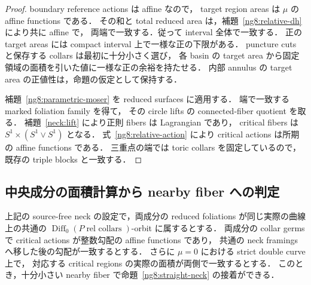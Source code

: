 \begin{proof}
boundary reference actions は affine なので，
target region areas は $\mu$ の affine functions である．
その和と total reduced area は，補題~\ref{ng8:relative-dh} により共に affine で，
両端で一致する．従って interval 全体で一致する．
正の target areas には compact interval 上で一様な正の下限がある．
puncture cuts と保存する collars は最初に十分小さく選び，
各 basin の target area から固定領域の面積を引いた値に一様な正の余裕を持たせる．
内部 annulus の target area の正値性は，命題の仮定として保持する．

補題~\ref{ng8:parametric-moser} を reduced surfaces に適用する．
端で一致する marked foliation family を得て，
その circle lifts の connected-fiber quotient を取る．
補題~\ref{neck:lift} により正則 fibers は Lagrangian であり，
critical fibers は $S^1\times(S^1\vee S^1)$ となる．
式~\eqref{ng8:relative-action} により critical actions は所期の affine functions である．
三重点の端では toric collars を固定しているので，既存の triple blocks と一致する．
\end{proof}

\subsection{中央成分の面積計算から nearby fiber への判定}

\begin{corollary}
\label{ng8:central-criterion}
上記の source-free neck の設定で，両成分の reduced foliations が同じ実際の曲線上の共通の
$\operatorname{Diff}_0(P\operatorname{ rel\ collars})$-orbit に属するとする．
両成分の collar germs で critical actions が整数勾配の affine functions であり，
共通の neck framings へ移した後の勾配が一致するとする．
さらに $\mu=0$ における strict double curve 上で，
対応する critical regions の実際の面積が両側で一致するとする．
このとき，十分小さい nearby fiber で命題~\ref{ng8:straight-neck} の接着ができる．
\end{corollary}

